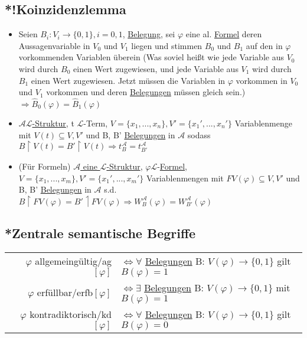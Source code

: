 \documentclass[12pt,a4paper]{article} %
\begin{document}
	\subsection{*!Koinzidenzlemma}
	\begin{itemize}
		\item Seien $B_i : V_i \rightarrow \{0, 1\}, i = 0, 1$, \hyperref[Belegung]{Belegung}, sei $\varphi$ eine al. \hyperref[Formel]{Formel} deren Aussagenvariable in $V_0$ und $V_1$ liegen und stimmen $B_0$ und $B_1$ auf den in $\varphi$ vorkommenden Variablen überein (Was soviel heißt wie jede Variable aus $V_0$ wird durch $B_0$ einen Wert zugewiesen, und jede Variable aus $V_1$ wird durch $B_1$ einen Wert zugewiesen. Jetzt müssen die Variablen in $\varphi$ vorkommen in $V_0$ und $V_1$ vorkommen und deren \hyperref[Belegung]{Belegungen} müssen gleich sein.) \newline 
		$\Rightarrow \widehat{B}_0(\varphi) = \widehat{B}_1(\varphi)$
		\item \hyperref[Struktur]{$\mathcal{A} \mathcal{L}$-Struktur}, t $\mathcal{L}$-Term, $V = \{x_1, ..., x_n\}, V' = \{x_1', ..., x_n'\}$ Variablenmenge mit $V(t)\subseteq V, V'$ und B, B' \hyperref[Belegung]{Belegungen} in $\mathcal{A}$ sodass $B \upharpoonright V(t) = B' \upharpoonright V(t) \Rightarrow t_B^{\mathcal{A}} = t_{B'}^{\mathcal{A}}$
		\item (Für Formeln) \newline
		\hyperref[Struktur]{$\mathcal{A}$ eine $\mathcal{L}$-Struktur}, $\varphi \mathcal{L}$-\hyperref[Formel]{Formel}, $V = \{x_1, ..., x_m\}, V' = \{x_1', ..., x_m'\}$ Variablenmengen mit $FV(\varphi) \subseteq V, V'$ und B, B' \hyperref[Belegung]{Belegungen} in $\mathcal{A}$ s.d. $B \upharpoonright FV(\varphi) = B' \upharpoonleft FV(\varphi) \Rightarrow W_B^{\mathcal{A}}(\varphi) = W_{B'}^{\mathcal{A}}(\varphi)$ 
	\end{itemize}
	
	\subsection{*Zentrale semantische Begriffe}
	\begin{tabular}{r l}
		$\varphi$ allgemeingültig/ag$[\varphi]$ & $\Leftrightarrow \forall$ \hyperref[Belegung]{Belegungen} B: $V(\varphi) \rightarrow \{0, 1\}$ gilt $B(\varphi) = 1$ \\
		$\varphi$ erfüllbar/erfb$[\varphi]$ & $\Leftrightarrow \exists$ \hyperref[Belegung]{Belegungen} B: $V(\varphi) \rightarrow \{0, 1\}$ mit $B(\varphi) = 1$ \\
		$\varphi$ kontradiktorisch/kd$[\varphi]$ & $\Leftrightarrow \forall$ \hyperref[Belegung]{Belegungen} B: $V(\varphi) \rightarrow \{0, 1\}$ gilt $B(\varphi) = 0$ 
	\end{tabular}
	
\end{document}

